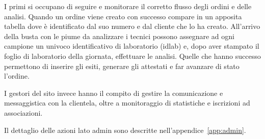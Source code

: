 I primi si occupano di seguire e monitorare il corretto flusso degli ordini e delle analisi. Quando un ordine viene creato con successo compare in un apposita tabella dove è identificato dal suo numero e dal cliente che lo ha creato. All'arrivo della busta con le piume da analizzare i tecnici possono assegnare ad ogni campione un univoco identificativo di laboratorio (idlab) e, dopo aver stampato il foglio di laboratorio della giornata, effettuare le analisi. Quelle che hanno successo permettono di inserire gli esiti, generare gli attestati e far avanzare di stato l'ordine.

I gestori del sito invece hanno il compito di gestire la comunicazione e messaggistica con la clientela, oltre a monitoraggio di statistiche e iscrizioni ad associazioni.

Il dettaglio delle azioni lato admin sono descritte nell'appendice~\ref{app:admin}.
